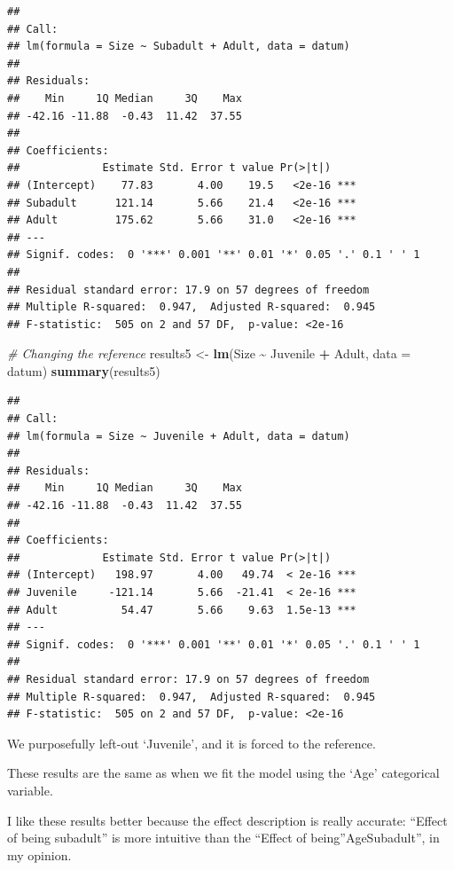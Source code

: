 \documentclass[
]{article}
\newenvironment{Shaded}{\begin{snugshade}}{\end{snugshade}}
\newcommand{\AttributeTok}[1]{\textcolor[rgb]{0.13,0.29,0.53}{#1}}
\newcommand{\CommentTok}[1]{\textcolor[rgb]{0.56,0.35,0.01}{\textit{#1}}}
\newcommand{\FunctionTok}[1]{\textcolor[rgb]{0.13,0.29,0.53}{\textbf{#1}}}
\newcommand{\NormalTok}[1]{#1}
\newcommand{\OtherTok}[1]{\textcolor[rgb]{0.56,0.35,0.01}{#1}}
\newcommand{\SpecialCharTok}[1]{\textcolor[rgb]{0.81,0.36,0.00}{\textbf{#1}}}
\begin{document}
\begin{verbatim}
## 
## Call:
## lm(formula = Size ~ Subadult + Adult, data = datum)
## 
## Residuals:
##    Min     1Q Median     3Q    Max 
## -42.16 -11.88  -0.43  11.42  37.55 
## 
## Coefficients:
##             Estimate Std. Error t value Pr(>|t|)    
## (Intercept)    77.83       4.00    19.5   <2e-16 ***
## Subadult      121.14       5.66    21.4   <2e-16 ***
## Adult         175.62       5.66    31.0   <2e-16 ***
## ---
## Signif. codes:  0 '***' 0.001 '**' 0.01 '*' 0.05 '.' 0.1 ' ' 1
## 
## Residual standard error: 17.9 on 57 degrees of freedom
## Multiple R-squared:  0.947,  Adjusted R-squared:  0.945 
## F-statistic:  505 on 2 and 57 DF,  p-value: <2e-16
\end{verbatim}

\begin{Shaded}
\begin{Highlighting}[]
\CommentTok{\# Changing the reference}
\NormalTok{results5 }\OtherTok{\textless{}{-}} \FunctionTok{lm}\NormalTok{(Size }\SpecialCharTok{\textasciitilde{}}\NormalTok{ Juvenile }\SpecialCharTok{+}\NormalTok{ Adult, }\AttributeTok{data =}\NormalTok{ datum)}
\FunctionTok{summary}\NormalTok{(results5)}
\end{Highlighting}
\end{Shaded}

\begin{verbatim}
## 
## Call:
## lm(formula = Size ~ Juvenile + Adult, data = datum)
## 
## Residuals:
##    Min     1Q Median     3Q    Max 
## -42.16 -11.88  -0.43  11.42  37.55 
## 
## Coefficients:
##             Estimate Std. Error t value Pr(>|t|)    
## (Intercept)   198.97       4.00   49.74  < 2e-16 ***
## Juvenile     -121.14       5.66  -21.41  < 2e-16 ***
## Adult          54.47       5.66    9.63  1.5e-13 ***
## ---
## Signif. codes:  0 '***' 0.001 '**' 0.01 '*' 0.05 '.' 0.1 ' ' 1
## 
## Residual standard error: 17.9 on 57 degrees of freedom
## Multiple R-squared:  0.947,  Adjusted R-squared:  0.945 
## F-statistic:  505 on 2 and 57 DF,  p-value: <2e-16
\end{verbatim}

We purposefully left-out `Juvenile', and it is forced to the reference.

These results are the same as when we fit the model using the `Age'
categorical variable.

I like these results better because the effect description is really
accurate: ``Effect of being subadult'' is more intuitive than the
``Effect of being''AgeSubadult'', in my opinion.
\end{document}
